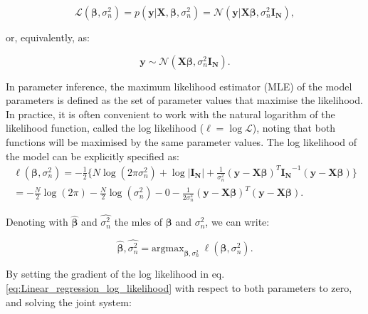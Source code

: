 \begin{equation} \label{eq:Linear_regression_likelihood}
 \mathcal{L}(\boldsymbol{\beta}, \sigma_n^2) = p(\mathbf{y}| \mathbf{X}, \boldsymbol{\beta}, \sigma_n^2) = \mathcal{N}(\mathbf{y} | \mathbf{X}\boldsymbol{\beta}, \sigma_n^2 \mathbf{I_N}),
\end{equation}

\newpage

or, equivalently, as:

\begin{equation} \label{eq:Linear_regression_MVN_form}
\mathbf{y} \sim \mathcal{N}(\mathbf{X}\boldsymbol{\beta}, \sigma_n^2 \mathbf{I_N}). 
\end{equation}

In parameter inference, the maximum likelihood estimator (MLE) of the model parameters is defined as the set of parameter values that maximise the likelihood.
In practice, it is often convenient to work with the natural logarithm of the likelihood function, called the log likelihood ($\ell = \log \mathcal{L}$), noting that both functions will be maximised by the same parameter values.
The log likelihood of the model can be explicitly specified as:\\

\begin{equation} \label{eq:Linear_regression_log_likelihood}
\begin{split}
 \ell(\boldsymbol{\beta}, \sigma_n^2) = -\frac{1}{2} \bigg\{N \log (2\pi\sigma_n^2) + \log |\mathbf{I_N}|+ \frac{1}{\sigma_n^2}(\mathbf{y}-\mathbf{X}\boldsymbol{\beta})^T\mathbf{I_N}^{-1}(\mathbf{y}-\mathbf{X}\boldsymbol{\beta}) \bigg\} \\
= -\frac{N}{2} \log (2\pi) - \frac{N}{2} \log(\sigma_n^2)- 0 - \frac{1}{2\sigma_n^2}(\mathbf{y}-\mathbf{X}\boldsymbol{\beta})^T(\mathbf{y}-\mathbf{X}\boldsymbol{\beta}). 
\end{split}
\end{equation}

Denoting with $\hat{\boldsymbol{\beta}}$ and $\hat{\sigma_n^2}$ the \gls{mle}s of $\boldsymbol{\beta}$ and $\sigma_n^2$, we can write:

\begin{equation} \label{eq:Linear_regression_MLEs}
\hat{\boldsymbol{\beta}},\hat{\sigma_n^2} = \mathrm{argmax}_{\boldsymbol{\beta},\sigma_n^2} \ \ell(\boldsymbol{\beta}, \sigma_n^2). 
\end{equation} 

By setting the gradient of the log likelihood in eq. \eqref{eq:Linear_regression_log_likelihood} with respect to both parameters to zero, and solving the joint system:

